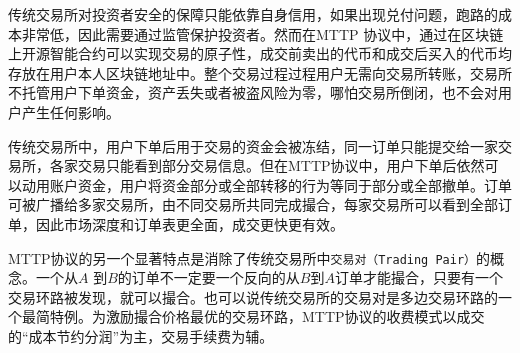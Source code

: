 \documentclass[UTF8,nofonts]{ctexart}
\begin{document}
传统交易所对投资者安全的保障只能依靠自身信用，如果出现兑付问题，跑路的成本非常低，因此需要通过监管保护投资者。然而在MTTP 协议中，通过在区块链上开源智能合约可以实现交易的原子性，成交前卖出的代币和成交后买入的代币均存放在用户本人区块链地址中。整个交易过程过程用户无需向交易所转账，交易所不托管用户下单资金，资产丢失或者被盗风险为零，哪怕交易所倒闭，也不会对用户产生任何影响。


传统交易所中，用户下单后用于交易的资金会被冻结，同一订单只能提交给一家交易所，各家交易只能看到部分交易信息。但在MTTP协议中，用户下单后依然可以动用账户资金，用户将资金部分或全部转移的行为等同于部分或全部撤单。订单可被广播给多家交易所，由不同交易所共同完成撮合，每家交易所可以看到全部订单，因此市场深度和订单表更全面，成交更快更有效。

MTTP协议的另一个显著特点是消除了传统交易所中\texttt{交易对（Trading Pair）}的概念。一个从$A$ 到$B$的订单不一定要一个反向的从$B$到$A$订单才能撮合，只要有一个交易环路被发现，就可以撮合。也可以说传统交易所的交易对是多边交易环路的一个最简特例。为激励撮合价格最优的交易环路，MTTP协议的收费模式以成交的“成本节约分润”为主，交易手续费为辅。
\end{document}
